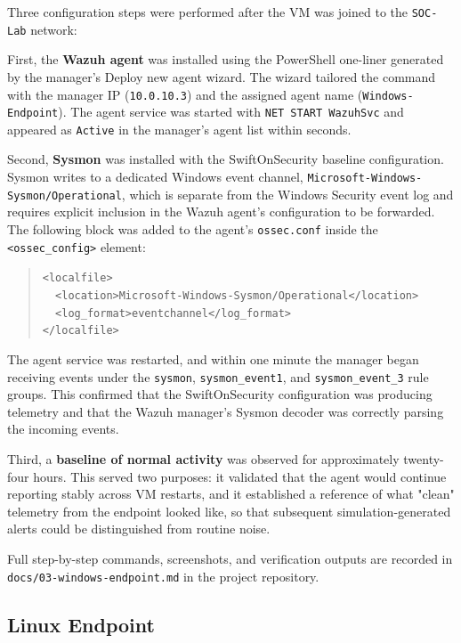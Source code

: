 Three configuration steps were performed after the VM was joined to the
\texttt{SOC-Lab} network:

First, the \textbf{Wazuh agent} was installed using the PowerShell one-liner
generated by the manager's Deploy new agent wizard. The wizard tailored the
command with the manager IP (\texttt{10.0.10.3}) and the assigned agent name
(\texttt{Windows-Endpoint}). The agent service was started with
\texttt{NET START WazuhSvc} and appeared as \texttt{Active} in the
manager's agent list within seconds.

Second, \textbf{Sysmon} was installed with the SwiftOnSecurity baseline
configuration. Sysmon writes to a dedicated Windows event channel,
\texttt{Microsoft-Windows-Sysmon/Operational}, which is separate from the
Windows Security event log and requires explicit inclusion in the Wazuh
agent's configuration to be forwarded. The following block was added to the
agent's \texttt{ossec.conf} inside the \texttt{<ossec\_config>} element:

\begin{quote}\small
\texttt{<localfile>}\\
\texttt{~~<location>Microsoft-Windows-Sysmon/Operational</location>}\\
\texttt{~~<log\_format>eventchannel</log\_format>}\\
\texttt{</localfile>}
\end{quote}

The agent service was restarted, and within one minute the manager began
receiving events under the \texttt{sysmon}, \texttt{sysmon\_event1}, and
\texttt{sysmon\_event\_3} rule groups. This confirmed that the SwiftOnSecurity
configuration was producing telemetry and that the Wazuh manager's Sysmon
decoder was correctly parsing the incoming events.

Third, a \textbf{baseline of normal activity} was observed for approximately
twenty-four hours. This served two purposes: it validated that the agent
would continue reporting stably across VM restarts, and it established a
reference of what "clean" telemetry from the endpoint looked like, so that
subsequent simulation-generated alerts could be distinguished from routine
noise.

Full step-by-step commands, screenshots, and verification outputs are
recorded in \texttt{docs/03-windows-endpoint.md} in the project repository.

\subsection{Linux Endpoint}
\label{sec:impl-linux}

